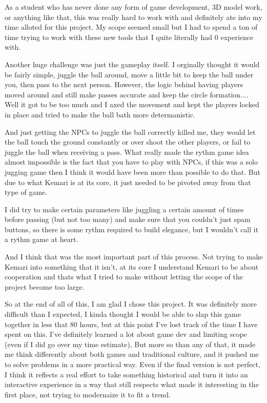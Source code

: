 \documentclass[12pt]{article}
\begin{document}
As a student who has never done any form of game development, 3D model work, or anything like that, this was really hard to work with and definitely ate into my time alloted for this project. My scope seemed small but I had to spend a ton of time trying to work with these new tools that I quite literally had 0 experience with.

Another huge challenge was just the gameplay itself. I orginally thought it would be fairly simple, juggle the ball around, move a little bit to keep the ball under you, then pass to the next person. However, the logic behind having players moved around and still make passes accurate and keep the circle formation.... Well it got to be too much and I axed the movement and kept the players locked in place and tried to make the ball bath more determanistic. 

And just getting the NPCs to juggle the ball correctly killed me, they would let the ball touch the ground constantly or over shoot the other players, or fail to juggle the ball when receiving a pass. What really made the rythm game idea almost impossible is the fact that you have to play with NPCs, if this was a solo jugging game then I think it would have been more than possible to do that. But due to what Kemari is at its core, it just needed to be pivoted away from that type of game.

I did try to make certain parameters like juggling a certain amount of times before passing (but not too many) and make sure that you couldn't just spam buttons, so there is some rythm required to build elegance, but I wouldn't call it a rythm game at heart.

And I think that was the most important part of this process. Not trying to make Kemari into something that it isn't, at its core I understand Kemari to be about cooperation and thats what I tried to make without letting the scope of the project become too large. 

So at the end of all of this, I am glad I chose this project. It was definitely more difficult than I expected, I kinda thought I would be able to slap this game together in less that 80 hours, but at this point I've lost track of the time I have spent on this. I've definitely learned a lot about game dev and limiting scope (even if I did go over my time estimate), But more so than any of that, it made me think differently about both games and traditional culture, and it pushed me to solve problems in a more practical way. Even if the final version is not perfect, I think it reflects a real effort to take something historical and turn it into an interactive experience in a way that still respects what made it interesting in the first place, not trying to modernaize it to fit a trend.
\end{document}
